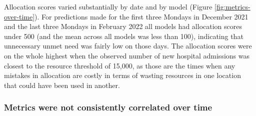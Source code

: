 \documentclass{article}\usepackage[]{graphicx}\usepackage[]{xcolor}
\begin{document}
Allocation scores varied substantially by date and by model (Figure \ref{fig:metrics-over-time}).
For predictions made for the first three Mondays in December 2021 and the last three Mondays in February 2022 all models had allocation scores under 500 (and the mean across all models was less than 100), indicating that unnecessary unmet need was fairly low on those days.
The allocation scores were on the whole highest when the observed number of new hospital admissions was closest to the resource threshold of 15,000, as those are the times when any mistakes in allocation are costly in terms of wasting resources in one location that could have been used in another.










\subsubsection{Metrics were not consistently correlated over time}
\end{document}
